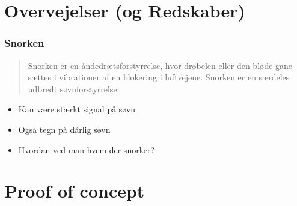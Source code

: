 \section{Overvejelser (og Redskaber)}

\begin{frame}
\frametitle{Snorken}
	\begin{quote}
	Snorken er en åndedrætsforstyrrelse, hvor drøbelen eller den bløde gane sættes i vibrationer af en blokering i luftvejene.
	Snorken er en særdeles udbredt søvnforstyrrelse.
	\end{quote}	

	\begin{itemize}
		\item Kan være stærkt signal på søvn
		\item Også tegn på dårlig søvn
		\item Hvordan ved man hvem der snorker?
	\end{itemize}
\end{frame}

\section{Proof of concept}

